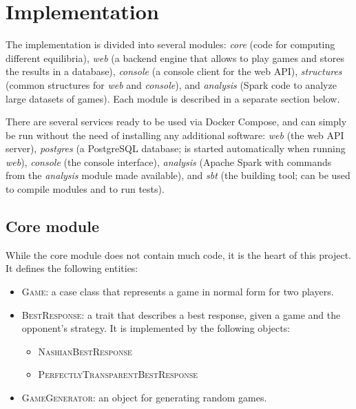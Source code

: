 \chapter{Implementation}
The implementation is divided into several modules: \textit{core} (code for computing different equilibria), \textit{web} (a backend engine that allows to play games and stores the results in a database), \textit{console} (a console client for the web API), \textit{structures} (common structures for \textit{web} and \textit{console}), and \textit{analysis} (Spark code to analyze large datasets of games).
Each module is described in a separate section below.

There are several services ready to be used via Docker Compose, and can simply be run without the need of installing any additional software:
\textit{web} (the web API server), \textit{postgres} (a PostgreSQL database; is started automatically when running \textit{web}), \textit{console} (the console interface), \textit{analysis} (Apache Spark with commands from the \textit{analysis} module made available), and \textit{sbt} (the building tool; can be used to compile modules and to run tests).

\section{Core module}
While the core module does not contain much code, it is the heart of this project.
It defines the following entities:
\begin{itemize}
	\item \textsc{Game}: a case class that represents a game in normal form for two players.
	\item \textsc{BestResponse}: a trait that describes a best response, given a game and the opponent's strategy.
	It is implemented by the following objects:
	\begin{itemize}
		\item \textsc{NashianBestResponse}
		\item \textsc{PerfectlyTransparentBestResponse}
	\end{itemize}
	\item \textsc{GameGenerator}: an object for generating random games.
\end{itemize}

